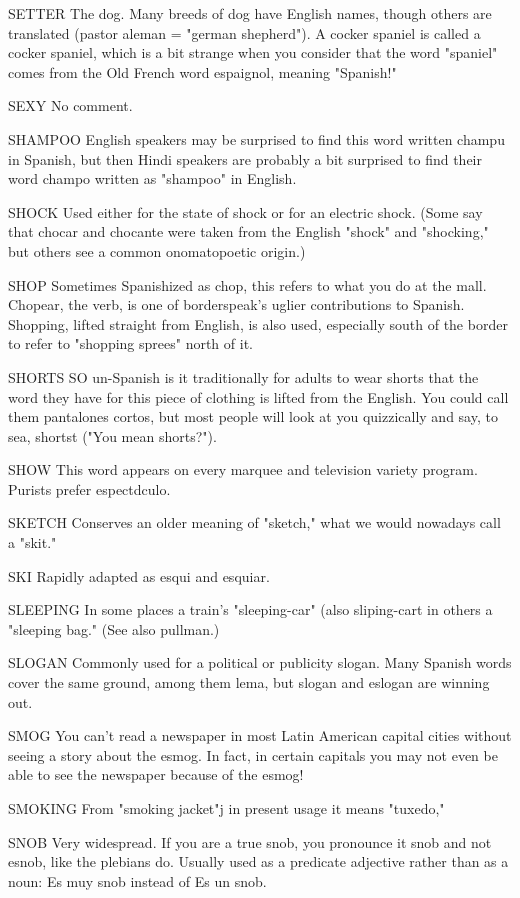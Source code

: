 SETTER The dog. Many breeds of dog have English names,
though others are translated (pastor aleman = "german shepherd"). A
cocker spaniel is called a cocker spaniel, which is a bit strange when
you consider that the word "spaniel" comes from the Old French word
espaignol, meaning "Spanish!"

SEXY No comment.

SHAMPOO English speakers may be surprised to find this
word written champu in Spanish, but then Hindi speakers are probably
a bit surprised to find their word champo written as "shampoo" in
English.

SHOCK Used either for the state of shock or for an electric
shock. (Some say that chocar and chocante were taken from the English "shock" and "shocking," but others see a common onomatopoetic origin.)

SHOP Sometimes Spanishized as chop, this refers to what
you do at the mall. Chopear, the verb, is one of borderspeak's uglier
contributions to Spanish. Shopping, lifted straight from English, is also
used, especially south of the border to refer to "shopping sprees" north
of it.

SHORTS SO un-Spanish is it traditionally for adults to wear
shorts that the word they have for this piece of clothing is lifted
from the English. You could call them pantalones cortos, but most
people will look at you quizzically and say, to sea, shortst ("You mean
shorts?").

SHOW This word appears on every marquee and television
variety program. Purists prefer espectdculo.

SKETCH Conserves an older meaning of "sketch," what we
would nowadays call a "skit."

SKI Rapidly adapted as esqui and esquiar.

SLEEPING In some places a train's "sleeping-car" (also
sliping-cart in others a "sleeping bag." (See also pullman.)

SLOGAN Commonly used for a political or publicity slogan.
Many Spanish words cover the same ground, among them lema, but
slogan and eslogan are winning out.

SMOG You can't read a newspaper in most Latin American
capital cities without seeing a story about the esmog. In fact, in certain capitals you may not even be able to see the newspaper because
of the esmog!

SMOKING From "smoking jacket"j in present usage it means
"tuxedo,"

SNOB Very widespread. If you are a true snob, you pronounce
it snob and not esnob, like the plebians do. Usually used as a predicate
adjective rather than as a noun: Es muy snob instead of Es un snob.

